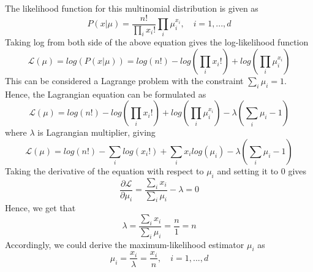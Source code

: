 \documentclass[12pt,a4paper]{article}
\begin{document}
	\noindent The likelihood function for this multinomial distribution is given as
	\begin{equation}
		P(x|\mu) = \frac{n!}{\prod_{i}x_i!}\prod_{i}\mu^{x_i}_i,\quad i=1, ..., d
	\end{equation}
	Taking log from both side of the above equation gives the log-likelihood function
	\begin{equation}
		\mathcal{L}(\mu) = log(P(x|\mu)) = log(n!)- log(\prod_{i}x_i!) +log(\prod_{i}\mu^{x_i}_i)
	\end{equation}
	This can be considered a Lagrange problem with the constraint $\sum_{i}\mu_i=1$. Hence, the Lagrangian equation can be formulated as
	\begin{equation}
		\mathcal{L}(\mu) = log(n!)- log(\prod_{i}x_i!) +log(\prod_{i}\mu^{x_i}_i) - \lambda(\sum_{i}\mu_i-1)
	\end{equation}
where $\lambda$ is Lagrangian multiplier, giving
\begin{equation}
	\mathcal{L}(\mu) = log(n!)- \sum_{i}log(x_i!) + \sum_{i}{x_i}log(\mu_i) - \lambda(\sum_{i}\mu_i-1)
\end{equation}
	Taking the derivative of the equation with respect to $\mu_i$ and setting it to 0 gives
	\begin{equation}
		\frac{\partial \mathcal{L}}{\partial \mu_i}= \frac{\sum_{i}x_i}{\sum_{i}\mu_i} - \lambda = 0
	\end{equation}
	Hence, we get that
	\begin{equation}
		 \lambda= \frac{\sum_{i}x_i}{\sum_{i}\mu_i} = \frac{n}{1} = n
	\end{equation}
	Accordingly, we could derive the maximum-likelihood estimator $\mu_i$ as
	\begin{equation}
		\mu_i= \frac{x_i}{\lambda} = \frac{x_i}{n},\quad i=1, ..., d
	\end{equation}
\end{document}
